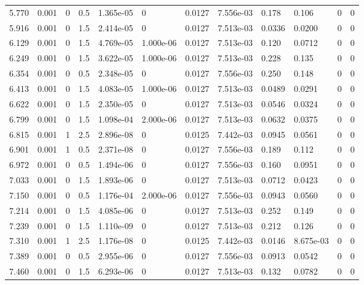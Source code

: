 \documentclass[preview]{standalone}
\begin{document}
{{{\begin{tabular}{L{1.2cm}C{1.2cm} C{0.3cm}C{0.5cm} C{1.4cm}C{1.4cm} C{1.4cm}C{1.4cm} C{1.6cm}C{1.6cm} C{1.6cm}C{1.6cm}}
  5.770  &  0.001  & 0     & 0.5 &  1.365e-05  & 0  &  0.0127&   7.556e-03& 0.178 & 0.106   &  0 & 0  \\ 
  5.916  &  0.001  & 0     & 1.5 &  2.414e-05  & 0  &  0.0127&   7.513e-03& 0.0336 & 0.0200   &  0 & 0  \\ 
  6.129  &  0.001  & 0     & 1.5 &  4.769e-05  & 1.000e-06  &  0.0127&   7.513e-03& 0.120 & 0.0712   &  0 & 0  \\ 
  6.249  &  0.001  & 0     & 1.5 &  3.622e-05  & 1.000e-06  &  0.0127&   7.513e-03& 0.228 & 0.135   &  0 & 0  \\ 
  6.354  &  0.001  & 0     & 0.5 &  2.348e-05  & 0  &  0.0127&   7.556e-03& 0.250 & 0.148   &  0 & 0  \\ 
  6.413  &  0.001  & 0     & 1.5 &  4.083e-05  & 1.000e-06  &  0.0127&   7.513e-03& 0.0489 & 0.0291   &  0 & 0  \\ 
  6.622  &  0.001  & 0     & 1.5 &  2.350e-05  & 0  &  0.0127&   7.513e-03& 0.0546 & 0.0324   &  0 & 0  \\ 
  6.799  &  0.001  & 0     & 1.5 &  1.098e-04  & 2.000e-06  &  0.0127&   7.513e-03& 0.0632 & 0.0375   &  0 & 0  \\ 
  6.815  &  0.001  & 1     & 2.5 &  2.896e-08  & 0  &  0.0125&   7.442e-03& 0.0945 & 0.0561   &  0 & 0  \\ 
  6.901  &  0.001  & 1     & 0.5 &  2.371e-08  & 0  &  0.0127&   7.556e-03& 0.189 & 0.112   &  0 & 0  \\ 
  6.972  &  0.001  & 0     & 0.5 &  1.494e-06  & 0  &  0.0127&   7.556e-03& 0.160 & 0.0951   &  0 & 0  \\ 
  7.033  &  0.001  & 0     & 1.5 &  1.893e-06  & 0  &  0.0127&   7.513e-03& 0.0712 & 0.0423   &  0 & 0  \\ 
  7.150  &  0.001  & 0     & 0.5 &  1.176e-04  & 2.000e-06  &  0.0127&   7.556e-03& 0.0943 & 0.0560   &  0 & 0  \\ 
  7.214  &  0.001  & 0     & 1.5 &  4.085e-06  & 0  &  0.0127&   7.513e-03& 0.252 & 0.149   &  0 & 0  \\ 
  7.239  &  0.001  & 0     & 1.5 &  1.110e-09  & 0  &  0.0127&   7.513e-03& 0.212 & 0.126   &  0 & 0  \\ 
  7.310  &  0.001  & 1     & 2.5 &  1.176e-08  & 0  &  0.0125&   7.442e-03& 0.0146 & 8.675e-03   &  0 & 0  \\ 
  7.389  &  0.001  & 0     & 0.5 &  2.955e-06  & 0  &  0.0127&   7.556e-03& 0.0913 & 0.0542   &  0 & 0  \\ 
  7.460  &  0.001  & 0     & 1.5 &  6.293e-06  & 0  &  0.0127&   7.513e-03& 0.132 & 0.0782   &  0 & 0  \\ 

\end{tabular}}}}
\end{document}
